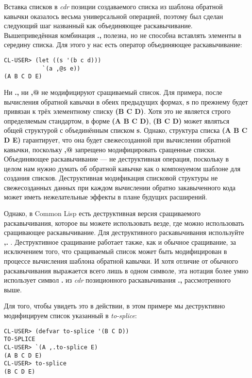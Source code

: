 Вставка списков в \emph{cdr} позиции создаваемого списка из шаблона обратной кавычки оказалось весьма универсальной операцией, поэтому был сделан следующий шаг названный как объединяющее раскавычивание. Вышеприведённая комбинация \textbf{.,} полезна, но не способна вставлять элементы в середину списка. Для этого у нас есть оператор объединяющее раскавычивание:

\begin{verbatim}
CL-USER> (let ((s '(b c d)))
           `(a ,@s e))
(A B C D E)
\end{verbatim}

Ни \textbf{.,} ни \textbf{,@} не модифицируют сращиваемый список. Для примера, после вычисления обратной кавычки в обеих предыдущих формах, \textbf{s} по прежнему будет привязан к трёх элементному списку \textbf{(B C D)}. Хотя это не является строго определяемым стандартом, в форме \textbf{(A B C D)}, \textbf{(B C D)} может являться общей структурой с объединённым списком \textbf{s}. Однако, структура списка \textbf{(A B C D E)} гарантирует, что она будет свежесозданной при вычислении обратной кавычки, поскольку \textbf{,@} запрещено модифицировать сращенные списки. Объединяющее раскавычивание --- не деструктивная операция, поскольку в целом нам нужно думать об обратной кавычке как о компонуемом шаблоне для создания списков. Деструктивная модификация списковой структуры не свежесозданных данных при каждом вычислении обратно закавыченного кода может иметь нежелательные эффекты в плане будущих расширений.

Однако, в Common Lisp есть деструктивная версия сращиваемого раскавычивания, которое вы можете использовать везде, где можно использовать сращивающее раскавычивание. Для деструктивного раскавычивания используйте \textbf{,.} . Деструктивное сращивание работает также, как и обычное сращивание, за исключением того, что сращиваемый список может быть модифицирован в процессе вычисления шаблона обратной кавычки. И хотя отличие от обычного раскавычивания выражается всего лишь в одном символе, эта нотация более умно использует символ \textbf{.} из \emph{cdr} позиционного раскавычивания \textbf{.,} рассмотренного выше.

Для того, чтобы увидеть это в действии, в этом примере мы деструктивно модифицируем список указанный в \emph{to-splice}:

\begin{verbatim}
CL-USER> (defvar to-splice '(B C D))
TO-SPLICE
CL-USER> `(A ,.to-splice E)
(A B C D E)
CL-USER> to-splice
(B C D E)
\end{verbatim}


